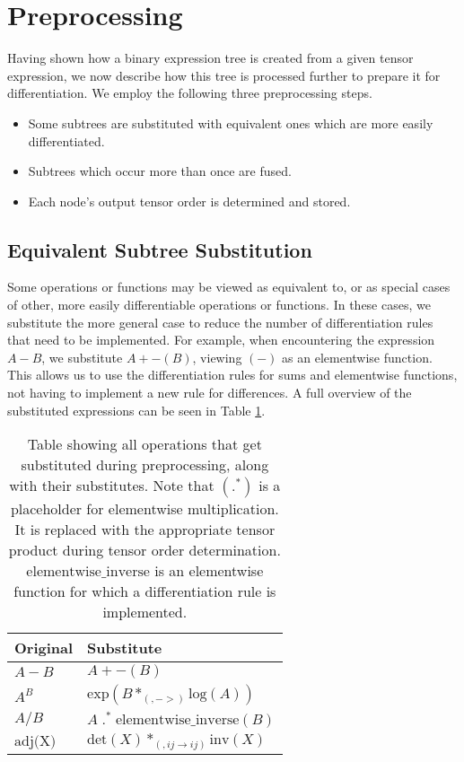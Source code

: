 \documentclass[12pt, a4paper]{report}
\begin{document}
\section{Preprocessing}
Having shown how a binary expression tree is created from a given tensor expression, we now describe how this tree is processed further to prepare it for differentiation.
We employ the following three preprocessing steps.
\begin{itemize}
    \item Some subtrees are substituted with equivalent ones which are more easily differentiated.
    \item Subtrees which occur more than once are fused.
    \item Each node's output tensor order is determined and stored.
\end{itemize}

\subsection{Equivalent Subtree Substitution}
Some operations or functions may be viewed as equivalent to, or as special cases of other, more easily differentiable operations or functions.
In these cases, we substitute the more general case to reduce the number of differentiation rules that need to be implemented.
For example, when encountering the expression $A - B$, we substitute $A + -(B)$, viewing $(-)$ as an elementwise function.
This allows us to use the differentiation rules for sums and elementwise functions, not having to implement a new rule for differences.
A full overview of the substituted expressions can be seen in Table \ref{tab:substitutions}.
\begin{table}[ht]
    \centering
    \begin{tabular}{l | l}
        Original & Substitute \\\hline
        $A-B$ & $A + -(B)$ \\
        $A^B$ & $\text{exp}(B *_{(,->)} \text{log}(A))$ \\ %
        $A/B$ & $A \;.^*\; \text{elementwise\_inverse}(B)$ \\
        $\text{adj(X)}$ & $\text{det}(X) *_{(,ij \rightarrow ij)} \text{inv}(X)$ \\ 
    \end{tabular}
    \caption{Table showing all operations that get substituted during preprocessing, along with their substitutes. Note that $(.^*)$ is a placeholder for elementwise multiplication. It is replaced with the appropriate tensor product during tensor order determination. $\text{elementwise\_inverse}$ is an elementwise function for which a differentiation rule is implemented.}
    \label{tab:substitutions}
\end{table}
\FloatBarrier
\end{document}
